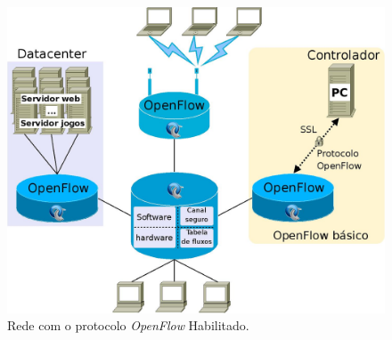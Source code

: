 \begin{figure}[h] \centering
\includegraphics[width=130mm]{openflow.png} 
\caption{Rede com o protocolo \textit{OpenFlow} Habilitado.} 
\label{fig:openflow} 
\end{figure}
